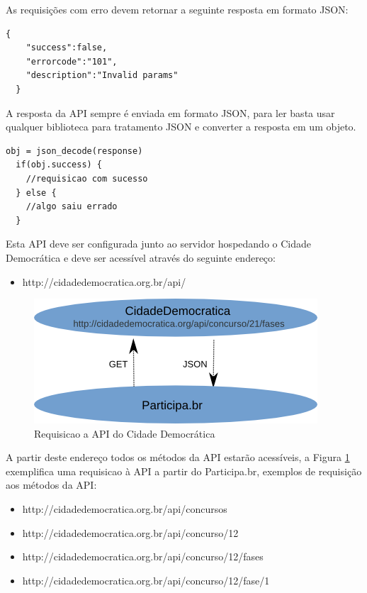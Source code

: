 \documentclass[12pt]{article}
\begin{document}
As requisições com erro devem retornar a seguinte resposta em formato JSON:

\begin{framed}
\begin{lstlisting}[caption=Exemplo de retorno JSON com erro]
  {
    "success":false,
    "errorcode":"101",
    "description":"Invalid params"
  }
\end{lstlisting}
\end{framed}

A resposta da API sempre é enviada em formato JSON, para ler basta usar
qualquer biblioteca para tratamento JSON e converter a resposta em um objeto.

\begin{framed}
\begin{lstlisting}[caption=Pseudo-código com exemplo de como tratar o retorno JSON]
  obj = json_decode(response)
  if(obj.success) {
    //requisicao com sucesso
  } else {
    //algo saiu errado
  }
\end{lstlisting}
\end{framed}

Esta API deve ser configurada junto ao servidor hospedando o Cidade
Democrática e deve ser acessível através do seguinte endereço:

\begin{itemize}
  \item http://cidadedemocratica.org.br/api/
\end{itemize}

\begin{figure}[h]
\center
\includegraphics[scale=0.5]{diagrama.png}
\caption{Requisicao a API do Cidade Democrática}
\label{diagrama}
\end{figure}

A partir deste endereço todos os métodos da API estarão acessíveis, a Figura
\ref{diagrama} exemplifica uma requisicao à API a partir do Participa.br,
exemplos de requisição aos métodos da API:

\begin{itemize}
  \item http://cidadedemocratica.org.br/api/concursos
  \item http://cidadedemocratica.org.br/api/concurso/12
  \item http://cidadedemocratica.org.br/api/concurso/12/fases
  \item http://cidadedemocratica.org.br/api/concurso/12/fase/1
\end{itemize}
\end{document}
